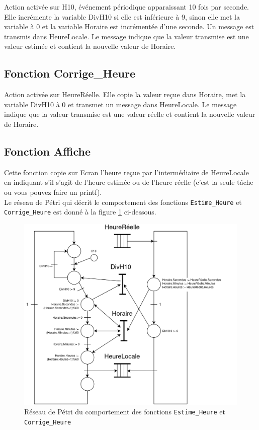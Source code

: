 \documentclass[french]{article}
\begin{document}
	
	Action activée sur H10, événement périodique apparaissant 10 fois par seconde. Elle
incrémente la variable DivH10 si elle est inférieure à 9, sinon elle met la variable à 0 et la
variable Horaire est incrémentée d’une seconde. Un message est transmis dans HeureLocale.
	Le message indique que la valeur transmise est une valeur estimée et contient la nouvelle	valeur de Horaire.
	
	\subsection*{Fonction Corrige\_Heure}
	
	Action activée sur HeureRéelle. Elle copie la valeur reçue dans Horaire, met la
variable DivH10 à 0 et transmet un message dans HeureLocale. Le message indique que la
valeur transmise est une valeur réelle et contient la nouvelle valeur de Horaire.
	
	\subsection*{Fonction Affiche}
	
	Cette fonction copie sur Ecran l’heure reçue par l’intermédiaire de HeureLocale en
indiquant s’il s’agit de l’heure estimée ou de l’heure réelle (c’est la seule tâche ou vous
pouvez faire un printf).\\
	
	
	Le réseau de Pétri qui décrit le comportement des fonctions \texttt{Estime\_Heure} et \texttt{Corrige\_Heure} est donné à la figure \ref{fig:reseau_petri} ci-dessous.
	
	
	\begin{figure}[H]
		\centering
		\includegraphics[width=13cm]{photo/reseau_petri}
		\caption{Réseau de Pétri du comportement des fonctions \texttt{Estime\_Heure} et \texttt{Corrige\_Heure}}
		\label{fig:reseau_petri}
	\end{figure}
	
\end{document}
